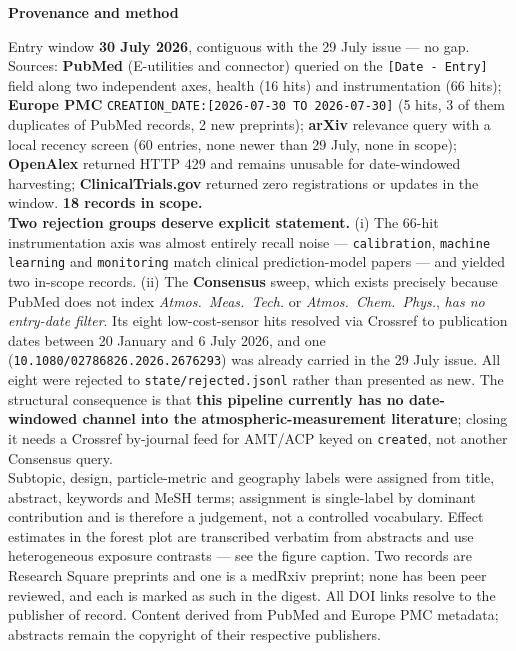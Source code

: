 \documentclass[10pt]{article}
\begin{document}
\vspace{4mm}
\begin{keybox}
{\sffamily\bfseries\footnotesize\color{Deep}Provenance and method}\\[1.2mm]
{\fontsize{7.2}{8.8}\selectfont
Entry window \textbf{30 July 2026}, contiguous with the 29 July issue --- no gap.
Sources: \textbf{PubMed} (E-utilities and connector) queried on the \texttt{[Date -
Entry]} field along two independent axes, health (16 hits) and instrumentation (66 hits);
\textbf{Europe PMC} \texttt{CREATION\_DATE:[2026-07-30 TO 2026-07-30]} (5 hits, 3 of them
duplicates of PubMed records, 2 new preprints); \textbf{arXiv} relevance query with a
local recency screen (60 entries, none newer than 29 July, none in scope);
\textbf{OpenAlex} returned HTTP 429 and remains unusable for date-windowed harvesting;
\textbf{ClinicalTrials.gov} returned zero registrations or updates in the window.
\textbf{18 records in scope.}
\\[1.0mm]
\textbf{Two rejection groups deserve explicit statement.} (i) The 66-hit instrumentation
axis was almost entirely recall noise --- \texttt{calibration}, \texttt{machine learning}
and \texttt{monitoring} match clinical prediction-model papers --- and yielded two
in-scope records. (ii) The \textbf{Consensus} sweep, which exists precisely because
PubMed does not index \textit{Atmos.\ Meas.\ Tech.} or \textit{Atmos.\ Chem.\ Phys.},
\emph{has no entry-date filter}. Its eight low-cost-sensor hits resolved via Crossref to
publication dates between 20 January and 6 July 2026, and one
(\texttt{10.1080/02786826.2026.2676293}) was already carried in the 29 July issue. All
eight were rejected to \texttt{state/rejected.jsonl} rather than presented as new. The
structural consequence is that \textbf{this pipeline currently has no date-windowed
channel into the atmospheric-measurement literature}; closing it needs a Crossref
by-journal feed for AMT/ACP keyed on \texttt{created}, not another Consensus query.
\\[1.0mm]
Subtopic, design, particle-metric and geography labels were assigned from title,
abstract, keywords and MeSH terms; assignment is single-label by dominant contribution
and is therefore a judgement, not a controlled vocabulary. Effect estimates in the forest
plot are transcribed verbatim from abstracts and use heterogeneous exposure contrasts ---
see the figure caption. Two records are Research Square preprints and one is a medRxiv
preprint; none has been peer reviewed, and each is marked as such in the digest.
All DOI links resolve to the publisher of record. Content derived from PubMed and
Europe PMC metadata; abstracts remain the copyright of their respective publishers.\par}
\end{keybox}
\end{document}
